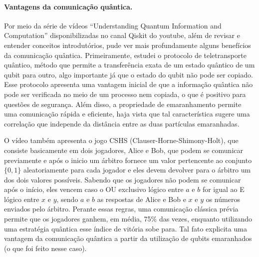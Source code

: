 \documentclass{article}
\begin{document}
            
        \paragraph{Vantagens da comunicação quântica.}
        Por meio da série de vídeos ``Understanding Quantum Information and Computation'' disponibilizadas no canal Qiskit do youtube, além de revisar e entender conceitos introdutórios, pude ver mais profundamente alguns benefícios da comunicação quântica. Primeiramente, estudei o protocolo de teletransporte quântico, método que permite a transferência exata de um estado quântico de um qubit para outro, algo importante já que o estado do qubit não pode ser copiado. Esse protocolo apresenta uma vantagem inicial de que a informação quântica não pode ser verificada no meio de um processo nem copiada, o que é positivo para questões de segurança. Além disso, a propriedade de emaranhamento permite uma comunicação rápida e eficiente, haja vista que tal característica sugere uma correlação que independe da distância entre as duas partículas emaranhadas.

        O vídeo também apresenta o jogo CSHS (Clauser-Horne-Shimony-Holt), que consiste basicamente em dois jogadores, Alice e Bob, que podem se comunicar previamente e após o inicio um árbitro fornece um valor pertencente ao conjunto $\{0,1\}$ aleatoriamente para cada jogador e eles devem devolver para o árbitro um dos dois valores possíveis. Sabendo que os jogadores não podem se comunicar após o início, eles vencem caso o OU exclusivo lógico entre $a$ e $b$ for igual ao E lógico entre $x$ e $y$, sendo $a$ e $b$ as respostas de Alice e Bob e $x$ e $y$ os números enviados pelo árbitro. Perante essas regras, uma comunicação clássica prévia permite que os jogadores ganhem, em média, 75\% das vezes, enquanto utilizando uma estratégia quântica esse índice de vitória sobe para. Tal fato explicita uma vantagem da comunicação quântica a partir da utilização de qubits emaranhados (o que foi feito nesse caso).

    
        
\end{document}

